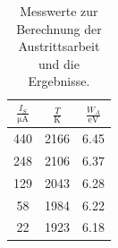 \documentclass[11pt,ngerman,a4paper]{article}
\begin{document}
\begin{table}
\centering
\begin{tabular}{ccc}
\toprule
$\frac{I_S}{\si{\micro\ampere}}$&$\frac{T}{\si{\kelvin}}$ &$\frac{W_A}{\si{\eV}}$\\
\midrule
440 & 2166 & 6.45\\
248 & 2106 & 6.37\\
129 & 2043 & 6.28\\
58 & 1984 & 6.22\\
22 & 1923 & 6.18\\
\bottomrule
\end{tabular}
\caption{Messwerte zur Berechnung der Austrittsarbeit und die Ergebnisse.}
\label{tab_e}

\end{table}
\end{document}
